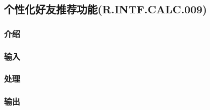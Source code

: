 \subsection{个性化好友推荐功能(R.INTF.CALC.009)}
\subsubsection{介绍}
\subsubsection{输入}
\subsubsection{处理}
\subsubsection{输出}